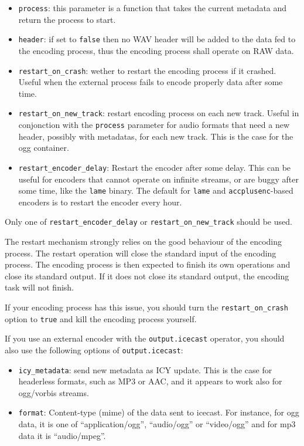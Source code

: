 \begin{itemize}
\item \verb+process+: this parameter is a function that takes the current metadata and return the process to start.
\item \verb+header+: if set to \verb+false+ then no WAV header will be added to the data fed to the encoding process, thus the encoding process shall operate on RAW data.
\item \verb+restart_on_crash+: wether to restart the encoding process if it crashed. Useful when the external process fails to encode properly data after some time.
\item \verb+restart_on_new_track+: restart encoding process on each new track. Useful in conjonction with the \verb+process+ parameter for audio formats that need a new header, possibly with metadatas, for each new track. This is the case for the ogg container.
\item \verb+restart_encoder_delay+: Restart the encoder after some delay. This can be useful for encoders that cannot operate on infinite streams, or are buggy after some time, like the \verb+lame+ binary. The default for \verb+lame+ and \verb+accplusenc+-based encoders is to restart the encoder every hour.

\end{itemize}
Only one of \verb+restart_encoder_delay+ or \verb+restart_on_new_track+ should be used.

The restart mechanism strongly relies on the good behaviour of the encoding process. The restart operation will 
close the standard input of the encoding process. The encoding process is then expected to finish its own operations and
close its standard output. If it does not close its standard output, the encoding task will not finish. 

If your encoding process has this issue, you should turn the \verb+restart_on_crash+ option to \verb+true+ and kill the encoding
process yourself.

If you use an external encoder with the \verb+output.icecast+ operator,
you should also use the following options of \verb+output.icecast+:

\begin{itemize}
\item \verb+icy_metadata+: send new metadata as ICY update. This is the case for headerless formats, such as MP3 or AAC, and it appears to work also for ogg/vorbis streams.
\item \verb+format+: Content-type (mime) of the data sent to icecast. For instance, for ogg data, it is one of ``application/ogg'', ``audio/ogg'' or ``video/ogg'' and for mp3 data it is ``audio/mpeg''.

\end{itemize}
